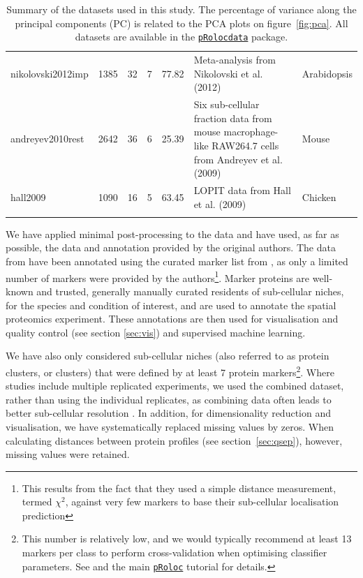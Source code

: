 \documentclass[12pt]{article}\usepackage[]{graphicx}\usepackage[]{color}
\newcommand{\Rpackage}[1]{\texttt{#1}}
\newcommand\Biocpkg[1]{%
  {\href{http://bioconductor.org/packages/#1}%
    {\Rpackage{#1}}}}
\newcommand\Biocexptpkg[1]{\Biocpkg{#1}}
\begin{document}
\begin{footnotesize}
\begin{landscape}
\begin{longtable}{lrrrrll}
  nikolovski2012imp & 1385 &  32 &   7 & 77.82 & Meta-analysis from Nikolovski et al. (2012) \citep{Nikolovski:2012} & Arabidopsis \\ 
  andreyev2010rest & 2642 &  36 &   6 & 25.39 & Six sub-cellular fraction data from mouse macrophage-like RAW264.7 cells from Andreyev et al. (2009) \citep{Andreyev:2010} & Mouse \\ 
  hall2009 & 1090 &  16 &   5 & 63.45 & LOPIT data from Hall et al. (2009) \citep{Hall:2009} & Chicken \\ 
   \bottomrule
\caption{Summary of the datasets used in this study. The percentage of variance along the principal components (PC) is related to the PCA plots on figure~\ref{fig:pca}. All datasets are available in the \Biocexptpkg{pRolocdata} package.} 
\label{tab:pdtab}
\end{longtable}

\end{landscape}
\end{footnotesize}


We have applied minimal post-processing to the data and have used, as
far as possible, the data and annotation provided by the original
authors. The data from \citet{Foster:2006} have been annotated using
the curated marker list from \citet{Christoforou:2016}, as only a
limited number of markers were provided by the authors\footnote{This
  results from the fact that they used a simple distance measurement,
  termed $\chi^2$, against very few markers to base their sub-cellular
  localisation prediction}. Marker proteins are well-known and
trusted, generally manually curated residents of sub-cellular niches,
for the species and condition of interest, and are used to annotate
the spatial proteomics experiment. These annotations are then used for
visualisation and quality control (see section \ref{sec:vis}) and
supervised machine learning.

We have also only considered sub-cellular niches (also referred to as
protein clusters, or clusters) that were defined by at least 7 protein
markers\footnote{This number is relatively low, and we would typically
  recommend at least 13 markers per class to perform cross-validation
  when optimising classifier parameters. See \citet{Gatto:2014} and
  the main \Biocpkg{pRoloc} tutorial for details.}. Where studies
include multiple replicated experiments, we used the combined dataset,
rather than using the individual replicates, as combining data often
leads to better sub-cellular resolution \citep{Trotter:2010}. In
addition, for dimensionality reduction and visualisation, we have
systematically replaced missing values by zeros. When calculating
distances between protein profiles (see section~\ref{sec:qsep}),
however, missing values were retained.
\end{document}

